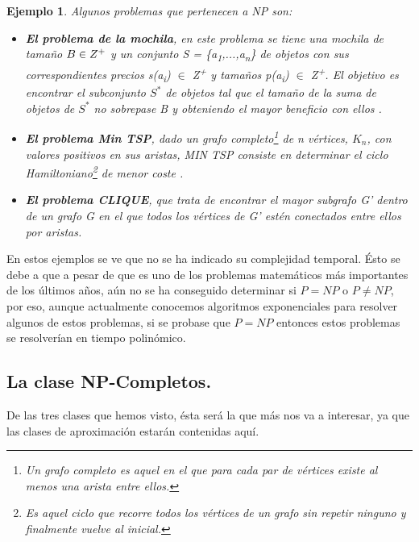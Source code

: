 \documentclass[a4paper,12pt,titlepage]{article}
\newtheorem{eje}{Ejemplo}[section]
\begin{document}
\begin{eje}

Algunos problemas que pertenecen a NP son:

\begin{itemize}

  \item \textbf{El problema de la mochila}, en este problema se tiene una mochila de tamaño $B \in Z\textsuperscript{+}$ y un conjunto S = \{a\textsubscript{1},...,a\textsubscript{n}\} de objetos con sus correspondientes precios s(a\textsubscript{i}) $\in$ Z\textsuperscript{+} y tamaños p(a\textsubscript{i}) $\in$ Z\textsuperscript{+}. El objetivo es encontrar el subconjunto $S^{*}$ de objetos tal que el tamaño de la suma de objetos de $S^{*}$ no sobrepase B y obteniendo el mayor beneficio con ellos \cite{knapsack1}.
  \item \textbf{El problema Min TSP}, dado un grafo completo\footnote{Un grafo completo es aquel en el que para cada par de v\'ertices existe al menos una arista entre ellos.} de n v\'ertices, $K_{n}$, con valores positivos en sus aristas, MIN TSP consiste en determinar el ciclo Hamiltoniano\footnote{Es aquel ciclo que recorre todos los v\'ertices de un grafo sin repetir ninguno y finalmente vuelve al inicial.} de menor coste \cite{approx_core}.
  \item \textbf{El problema CLIQUE}, que trata de encontrar el mayor subgrafo G' dentro de un grafo G en el que todos los v\'ertices de G' est\'en conectados entre ellos por aristas.

\end{itemize}

\end{eje}

En estos ejemplos se ve que no se ha indicado su complejidad temporal. \'Esto
se debe a que a pesar de que es uno de los problemas matem\'aticos m\'as
importantes de los \'ultimos años, a\'un no se ha conseguido determinar
si $P = NP$ o $P \neq NP$, por eso, aunque actualmente conocemos algoritmos
exponenciales para resolver algunos de estos problemas, si se probase que
$P = NP$ entonces estos problemas se resolver\'ian en tiempo polin\'omico.

\subsection{La clase NP-Completos.}

De las tres clases que hemos visto, \'esta ser\'a la que m\'as nos va a
interesar, ya que las clases de aproximaci\'on estar\'an contenidas aqu\'i.
\end{document}
